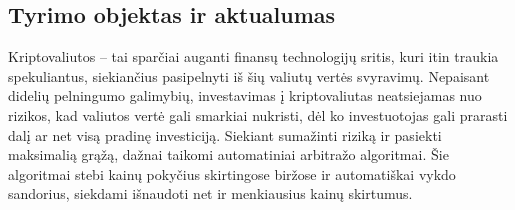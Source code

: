 \documentclass[]{VUMIFTemplateClass}
\begin{document}



\subsection*{Tyrimo objektas ir aktualumas}
Kriptovaliutos – tai sparčiai auganti finansų technologijų sritis, kuri itin traukia spekuliantus, siekiančius pasipelnyti iš šių valiutų vertės svyravimų. Nepaisant didelių pelningumo galimybių, investavimas į kriptovaliutas neatsiejamas nuo rizikos, kad valiutos vertė gali smarkiai nukristi, dėl ko investuotojas gali prarasti dalį ar net visą pradinę investiciją. Siekiant sumažinti riziką ir pasiekti maksimalią grąžą, dažnai taikomi automatiniai arbitražo algoritmai. Šie algoritmai stebi kainų pokyčius skirtingose biržose ir automatiškai vykdo sandorius, siekdami išnaudoti net ir menkiausius kainų skirtumus.
\end{document}
